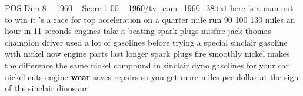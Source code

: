 \begin{textsample}{POS Dim 8 – 1960 – Score 1.00 – 1960/tv\_com\_1960\_38.txt}  \label{ex:f8_pos_063}
here 's a man out to win it 's a race for top acceleration on a quarter mile run 90 100 130 miles an hour in 11 seconds engines take a beating spark plugs misfire jack thomas champion driver used a lot of gasolines before trying a special sinclair gasoline with nickel now engine parts last longer spark plugs fire smoothly nickel makes the difference the same nickel compound in sinclair dyno gasolines for your car nickel cuts engine \textbf{wear} saves repairs so you get more miles per dollar at the sign of the sinclair dinosaur

\end{textsample}
